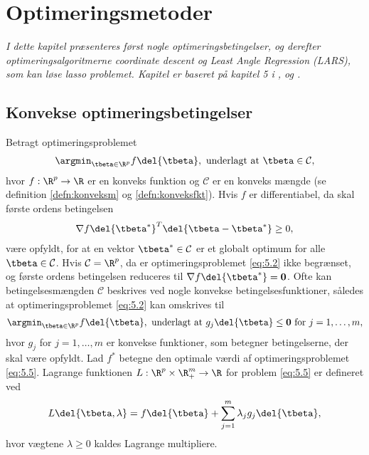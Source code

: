 \chapter{Optimeringsmetoder} \label{ch:optimeringsmetoder}
\textit{I dette kapitel præsenteres først nogle optimeringsbetingelser, og derefter optimeringsalgoritmerne coordinate descent og Least Angle Regression (LARS), som kan løse lasso problemet.
Kapitel er baseret på kapitel 5 i \citep{hastie}, \citep{glmnet1} og \citep{efron}.} 
%
\section{Konvekse optimeringsbetingelser}
Betragt optimeringsproblemet
\begin{align}
\argmin_{\tbeta \in \R^p} f \del{\tbeta}, \text{ underlagt at } \tbeta \in \mathcal{C}, \label{eq:5.2}
\end{align}
hvor \(f: \R^p \rightarrow \R\) er en konveks funktion og \(\mathcal{C}\) er en konveks mængde (se definition \ref{defn:konveksm} og \ref{defn:konveksfkt}).
Hvis \(f\) er differentiabel, da skal første ordens betingelsen
\begin{align}
\nabla f \del{\tbeta^*}^T \del{ \tbeta - \tbeta^*} \geq 0, \label{eq:5.3}
\end{align}
være opfyldt, for at en vektor \(\tbeta^* \in \mathcal{C}\) er et globalt optimum for alle \(\tbeta \in \mathcal{C}\). 
Hvis \(\mathcal{C} = \R^p\), da er optimeringsproblemet \eqref{eq:5.2} ikke begrænset, og første ordens betingelsen reduceres til \(\nabla f \del{\tbeta^*} = \mathbf{0}\).
Ofte kan betingelsesmængden \(\mathcal{C}\) beskrives ved nogle konvekse betingelsesfunktioner, således at optimeringsproblemet \eqref{eq:5.2} kan omskrives til
\begin{align}
\argmin_{\tbeta \in \R^p} f \del{\tbeta}, \text{ underlagt at } g_j \del{\tbeta} \leq \mathbf{0} \text{ for } j = 1, \ldots, m, \label{eq:5.5}
\end{align}
hvor \(g_j\) for \(j=1, \ldots, m\) er konvekse funktioner, som betegner betingelserne, der skal være opfyldt.
Lad \(f^*\) betegne den optimale værdi af optimeringsproblemet \eqref{eq:5.5}.
Lagrange funktionen \(L: \R^p \times \R^m_+ \rightarrow \R\) for problem \eqref{eq:5.5} er defineret ved
\begin{align*}
L \del{\tbeta, \lambda} = f \del{\tbeta} + \sum_{j=1}^m \lambda_j g_j \del{\tbeta},
\end{align*}
hvor vægtene \(\lambda \geq 0\) kaldes Lagrange multipliere.
